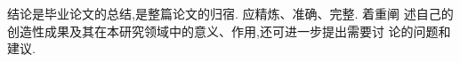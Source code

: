 \begin{conclusion}
  结论是毕业论文的总结,是整篇论文的归宿. 应精炼、准确、完整. 着重阐
  述自己的创造性成果及其在本研究领域中的意义、作用,还可进一步提出需要讨
  论的问题和建议. 
\end{conclusion}